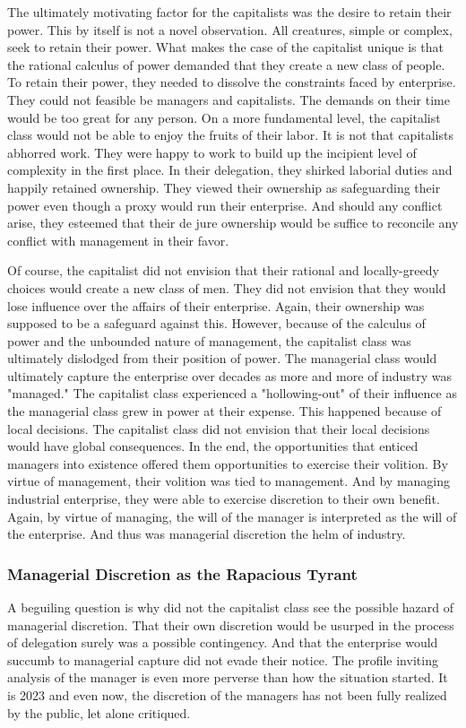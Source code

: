 \documentclass[12pt]{article}
\begin{document}
The ultimately motivating factor for the capitalists was the desire to retain their power.
This by itself is not a novel observation.
All creatures, simple or complex, seek to retain their power.
What makes the case of the capitalist unique is that the rational calculus of power demanded that they create a new class of people.
To retain their power, they needed to dissolve the constraints faced by enterprise.
They could not feasible be managers and capitalists.
The demands on their time would be too great for any person.
On a more fundamental level, the capitalist class would not be able to enjoy the fruits of their labor.
It is not that capitalists abhorred work.
They were happy to work to build up the incipient level of complexity in the first place.
In their delegation, they shirked laborial duties and happily retained ownership.
They viewed their ownership as safeguarding their power even though a proxy would run their enterprise.
And should any conflict arise, they esteemed that their de jure ownership would be suffice to reconcile any conflict with management in their favor.

Of course, the capitalist did not envision that their rational and locally-greedy choices would create a new class of men.
They did not envision that they would lose influence over the affairs of their enterprise.
Again, their ownership was supposed to be a safeguard against this.
However, because of the calculus of power and the unbounded nature of management, the capitalist class was ultimately dislodged from their position of power.
The managerial class would ultimately capture the enterprise over decades as more and more of industry was "managed."
The capitalist class experienced a "hollowing-out" of their influence as the managerial class grew in power at their expense.
This happened because of local decisions.
The capitalist class did not envision that their local decisions would have global consequences.
In the end, the opportunities that enticed managers into existence offered them opportunities to exercise their volition.
By virtue of management, their volition was tied to management.
And by managing industrial enterprise, they were able to exercise discretion to their own benefit.
Again, by virtue of managing, the will of the manager is interpreted as the will of the enterprise.
And thus was managerial discretion the helm of industry.

\subsubsection{Managerial Discretion as the Rapacious Tyrant}
A beguiling question is why did not the capitalist class see the possible hazard of managerial discretion.
That their own discretion would be usurped in the process of delegation surely was a possible contingency.
And that the enterprise would succumb to managerial capture did not evade their notice.
The profile inviting analysis of the manager is even more perverse than how the situation started.
It is 2023 and even now, the discretion of the managers has not been fully realized by the public, let alone critiqued.
\end{document}
